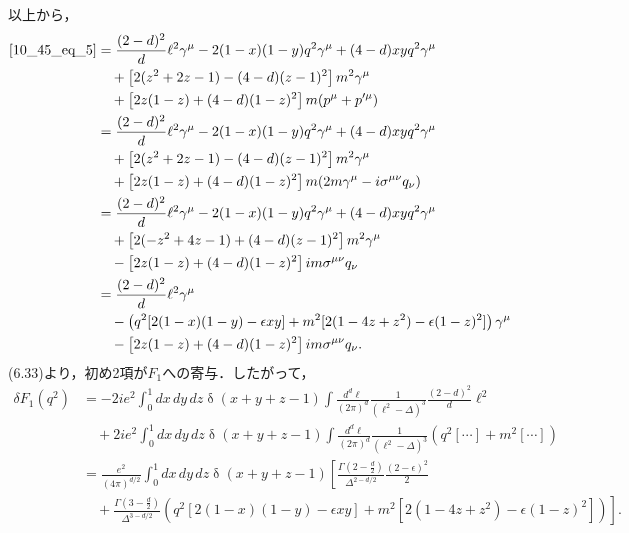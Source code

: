 以上から，
\begin{align*}
  \eqref{10_45_eq_5} &= \frac{(2-d)^2}{d} \ell^2 \gamma^\mu - 2 (1-x)(1-y) q^2 \gamma^\mu + (4-d) xy q^2 \gamma^\mu \\
  & \quad + \left[ 2(z^2 + 2z - 1) - (4-d)(z-1)^2 \right] m^2 \gamma^\mu \\
  & \quad + \left[ 2 z(1-z) + (4-d) (1-z)^2 \right] m(p^\mu + p'^\mu) \\
  &= \frac{(2-d)^2}{d} \ell^2 \gamma^\mu - 2 (1-x)(1-y) q^2 \gamma^\mu + (4-d) xy q^2 \gamma^\mu \\
  & \quad + \left[ 2(z^2 + 2z - 1) - (4-d)(z-1)^2 \right] m^2 \gamma^\mu \\
  & \quad + \left[ 2 z(1-z) + (4-d) (1-z)^2 \right] m (2m\gamma^\mu - i \sigma^{\mu\nu}q_\nu) \\
  &= \frac{(2-d)^2}{d} \ell^2 \gamma^\mu - 2 (1-x)(1-y) q^2 \gamma^\mu + (4-d) xy q^2 \gamma^\mu \\
  & \quad + \left[ 2(- z^2 + 4z - 1) + (4-d)(z-1)^2 \right] m^2 \gamma^\mu \\
  & \quad - \left[ 2 z(1-z) + (4-d) (1-z)^2 \right] im \sigma^{\mu\nu}q_\nu \\
  &= \frac{(2-d)^2}{d} \ell^2 \gamma^\mu \\
  & \quad - \left( q^2 [2(1-x)(1-y) - \epsilon xy] + m^2 [2(1-4z+z^2) - \epsilon(1-z)^2] \right) \gamma^\mu \\
  & \quad - \left[ 2 z(1-z) + (4-d) (1-z)^2 \right] im \sigma^{\mu\nu}q_\nu .
\end{align*}
(6.33)より，初め2項が$F_1$への寄与．したがって，
\begin{align*}
  \delta F_1(q^2) &= -2ie^2 \int_0^1 dx\,dy\,dz \mathop\delta(x+y+z-1) \int \frac{d^d\ell}{(2\pi)^d} \frac{1}{(\ell^2 - \Delta)^3} \frac{(2-d)^2}{d} \ell^2 \\
  & \quad + 2ie^2 \int_0^1 dx\,dy\,dz \mathop\delta(x+y+z-1) \int \frac{d^d\ell}{(2\pi)^d} \frac{1}{(\ell^2 - \Delta)^3} \left( q^2 [\cdots] + m^2 [\cdots] \right) \\
  &= \frac{e^2}{(4\pi)^{d/2}} \int_0^1 dx\,dy\,dz \mathop\delta(x+y+z-1) \left[ \frac{\Gamma(2-\frac{d}{2})}{\Delta^{2-d/2}} \frac{(2-\epsilon)^2}{2} \right. \\
  & \quad + \left. \frac{\Gamma(3-\frac{d}{2})}{\Delta^{3-d/2}} \left( q^2 [2(1-x)(1-y) - \epsilon xy] + m^2 [2(1-4z+z^2) - \epsilon(1-z)^2] \right) \right] .
\end{align*}

